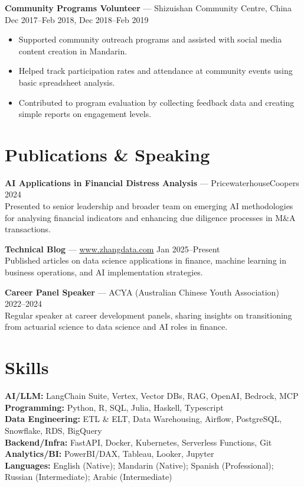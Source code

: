 \documentclass[10pt,letterpaper]{article}
\newcommand{\website}{https://www.zhangdata.com}
\begin{document}
\textbf{Community Programs Volunteer} — Shizuishan Community Centre, China \hfill Dec 2017--Feb 2018, Dec 2018--Feb 2019\\[-1.1em]
\begin{itemize}
  \item Supported community outreach programs and assisted with social media content creation in Mandarin.
  \item Helped track participation rates and attendance at community events using basic spreadsheet analysis.
  \item Contributed to program evaluation by collecting feedback data and creating simple reports on engagement levels.
\end{itemize}

\section*{Publications \& Speaking}

\textbf{AI Applications in Financial Distress Analysis} — PricewaterhouseCoopers \hfill 2024\\
Presented to senior leadership and broader team on emerging AI methodologies for analysing financial indicators and enhancing due diligence processes in M\&A transactions.

\textbf{Technical Blog} — \href{\website}{www.zhangdata.com} \hfill Jan 2025--Present\\
Published articles on data science applications in finance, machine learning in business operations, and AI implementation strategies.

\textbf{Career Panel Speaker} — ACYA (Australian Chinese Youth Association) \hfill 2022--2024\\
Regular speaker at career development panels, sharing insights on transitioning from actuarial science to data science and AI roles in finance.

\section*{Skills}

\textbf{AI/LLM:} LangChain Suite, Vertex, Vector DBs, RAG, OpenAI, Bedrock, MCP\\
\textbf{Programming:} Python, R, SQL, Julia, Haskell, Typescript\\
\textbf{Data Engineering:} ETL \& ELT, Data Warehousing, Airflow, PostgreSQL, Snowflake, RDS, BigQuery\\
\textbf{Backend/Infra:} FastAPI, Docker, Kubernetes, Serverless Functions, Git\\
\textbf{Analytics/BI:} PowerBI/DAX, Tableau, Looker, Jupyter\\
\textbf{Languages:} English (Native); Mandarin (Native); Spanish (Professional); Russian (Intermediate); Arabic (Intermediate)
\end{document}
